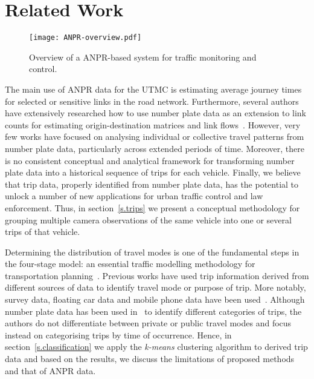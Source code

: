 \section{Related Work}
\label{s.related}

\begin{figure}[t]
\centering
\texttt{[image: ANPR-overview.pdf]}
\caption{Overview of a ANPR-based system for traffic monitoring and control.}
\label{fig:anpr-overview}
\vspace{-0.6cm}
\end{figure}

The main use of ANPR data for the UTMC is estimating average journey times for selected or sensitive links in the road network. Furthermore, several authors have extensively researched how to use number plate data as an extension to link counts for estimating origin-destination matrices and link flows~\cite{Castillo2010, Castillo2008, Hazelton2012}. However, very few works have focused on analysing individual or collective travel patterns from number plate data, particularly across extended periods of time. Moreover, there is no consistent conceptual and analytical framework for transforming number plate data into a historical sequence of trips for each vehicle. Finally, we believe that trip data, properly identified from number plate data, has the potential to unlock a number of new applications for urban traffic control and law enforcement. Thus, in section~\ref{s.trips} we present a conceptual methodology for grouping multiple camera observations of the same vehicle into one or several trips of that vehicle.

Determining the distribution of travel modes is one of the fundamental steps in the four-stage model: an essential traffic modelling methodology for transportation planning~\cite{FourStepModel}. Previous works have used trip information derived from different sources of data to identify travel mode or purpose of trip. More notably, survey data, floating car data and mobile phone data have been used~\cite{ODMobileData, ClusteringGPS}.  Although number plate data has been used in~\cite{Clustering} to identify different categories of trips, the authors do not differentiate between private or public travel modes and focus instead on categorising trips by time of occurrence. Hence, in section~\ref{s.classification} we apply the \emph{k-means} clustering algorithm to derived trip data and based on the results, we discuss the limitations of proposed methods and that of ANPR data.

